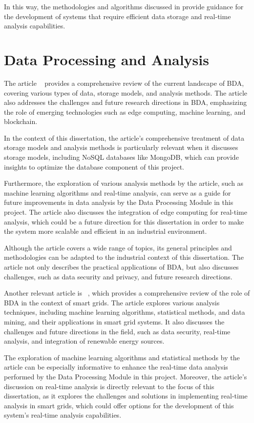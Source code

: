 In this way, the methodologies and algorithms discussed in \cite{sarker2021machine} provide guidance for the development of systems that require efficient data storage and real-time analysis capabilities.

\section{Data Processing and Analysis}
The article ~\cite{Lv2017} provides a comprehensive review of the current landscape of \gls{BDA}, covering various types of data, storage models, and analysis methods. The article also addresses the challenges and future research directions in \gls{BDA}, emphasizing the role of emerging technologies such as edge computing, machine learning, and blockchain.

In the context of this dissertation, the article's comprehensive treatment of data storage models and analysis methods is particularly relevant when it discusses storage models, including NoSQL databases like MongoDB, which can provide insights to optimize the database component of this project.

Furthermore, the exploration of various analysis methods by the article, such as machine learning algorithms and real-time analysis, can serve as a guide for future improvements in data analysis by the Data Processing Module in this project. The article also discusses the integration of edge computing for real-time analysis, which could be a future direction for this dissertation in order to make the system more scalable and efficient in an industrial environment.

Although the article covers a wide range of topics, its general principles and methodologies can be adapted to the industrial context of this dissertation. The article not only describes the practical applications of \gls{BDA}, but also discusses challenges, such as data security and privacy, and future research directions.

Another relevant article is ~\cite{Zhang2018}, which provides a comprehensive review of the role of \gls{BDA} in the context of smart grids. The article explores various analysis techniques, including machine learning algorithms, statistical methods, and data mining, and their applications in smart grid systems. It also discusses the challenges and future directions in the field, such as data security, real-time analysis, and integration of renewable energy sources.

The exploration of machine learning algorithms and statistical methods by the article can be especially informative to enhance the real-time data analysis performed by the Data Processing Module in this project. Moreover, the article's discussion on real-time analysis is directly relevant to the focus of this dissertation, as it explores the challenges and solutions in implementing real-time analysis in smart grids, which could offer options for the development of this system's real-time analysis capabilities.

